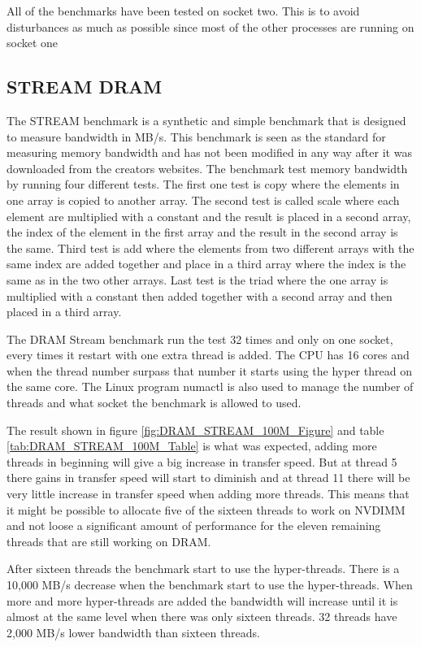 \documentclass[12pt,a4paper,USenglish]{article}      %
\begin{document}
All of the benchmarks have been tested on socket two. This is to avoid disturbances as much as possible since most of the other processes are running on socket one

\subsection{STREAM DRAM}
\label{section:STREAMDRAM}
The STREAM\cite{STREAM-c} benchmark is a synthetic and simple benchmark that is designed to measure bandwidth in MB/s. This benchmark is seen as the standard for measuring memory bandwidth and has not been modified in any way after it was downloaded from the creators websites.
The benchmark test memory bandwidth by running four different tests. The first one test is copy where the elements in one array is copied to another array.
The second test is called scale where each element are multiplied with a constant and the result is placed in a second array, the index of the element in the first array and the result in the second array is the same.
Third test is add where the elements from two different arrays with the same index are added together and place in a third array where the index is the same as in the two other arrays.
Last test is the triad where the one array is multiplied with a constant then added together with a second array and then placed in a third array.

The DRAM Stream benchmark run the test 32 times and only on one socket, every times it restart with one extra thread is added. The CPU has 16 cores and when the thread number surpass that number it starts using the hyper thread on the same core. The Linux program numactl is also used to manage the number of threads and what socket the benchmark is allowed to used.

The result shown in figure \ref{fig:DRAM_STREAM_100M_Figure} and table \ref{tab:DRAM_STREAM_100M_Table} is what was expected, adding more threads in beginning will give a big increase in transfer speed. But at thread 5 there gains in transfer speed will start to diminish and at thread 11 there will be very little increase in transfer speed when adding more threads.
This means that it might be possible to allocate five of the sixteen threads to work on NVDIMM and not loose a significant amount of performance for the eleven remaining threads that are still working on DRAM. 

After sixteen threads the benchmark start to use the hyper-threads. There is a 10,000 MB/s decrease when the benchmark start to use the hyper-threads. When more and more hyper-threads are added the bandwidth will increase until it is almost at the same level when there was only sixteen threads. 32 threads have 2,000 MB/s lower bandwidth than sixteen threads.
\end{document}
